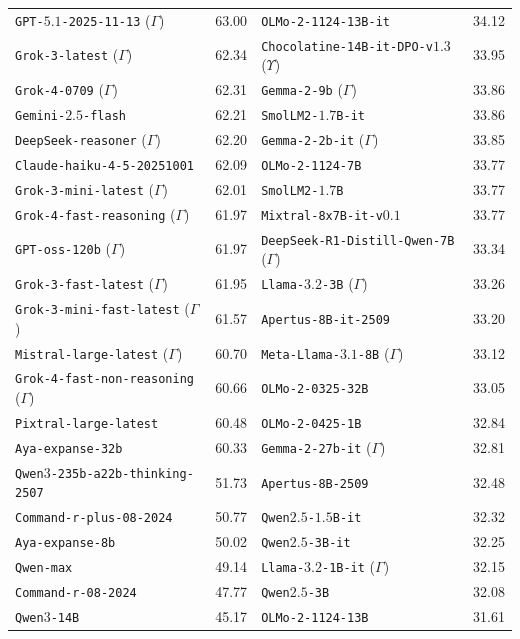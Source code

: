 \begin{tabular}{lrlr}
\texttt{GPT-$5.1$-2025-11-13} ($\Gamma$) & 63.00 & \texttt{OLMo-2-1124-13B-it} & 34.12 \\
\texttt{Grok-3-latest} ($\Gamma$) & 62.34 & \texttt{Chocolatine-14B-it-DPO-v$1.3$} ($\Upsilon$) & 33.95 \\
\texttt{Grok-4-0709} ($\Gamma$) & 62.31 & \texttt{Gemma-2-9b} ($\Gamma$) & 33.86 \\
\texttt{Gemini-$2.5$-flash} & 62.21 & \texttt{SmolLM2-$1.7$B-it} & 33.86 \\
\texttt{DeepSeek-reasoner} ($\Gamma$) & 62.20 & \texttt{Gemma-2-2b-it} ($\Gamma$) & 33.85 \\
\texttt{Claude-haiku-4-5-20251001} & 62.09 & \texttt{OLMo-2-1124-7B} & 33.77 \\
\texttt{Grok-3-mini-latest} ($\Gamma$) & 62.01 & \texttt{SmolLM2-$1.7$B} & 33.77 \\
\texttt{Grok-4-fast-reasoning} ($\Gamma$) & 61.97 & \texttt{Mixtral-8x7B-it-v$0.1$} & 33.77 \\
\texttt{GPT-oss-120b} ($\Gamma$) & 61.97 & \texttt{DeepSeek-R1-Distill-Qwen-7B} ($\Gamma$) & 33.34 \\
\texttt{Grok-3-fast-latest} ($\Gamma$) & 61.95 & \texttt{Llama-$3.2$-3B} ($\Gamma$) & 33.26 \\
\texttt{Grok-3-mini-fast-latest} ($\Gamma$) & 61.57 & \texttt{Apertus-8B-it-2509} & 33.20 \\
\texttt{Mistral-large-latest} ($\Gamma$) & 60.70 & \texttt{Meta-Llama-$3.1$-8B} ($\Gamma$) & 33.12 \\
\texttt{Grok-4-fast-non-reasoning} ($\Gamma$) & 60.66 & \texttt{OLMo-2-0325-32B} & 33.05 \\
\texttt{Pixtral-large-latest} & 60.48 & \texttt{OLMo-2-0425-1B} & 32.84 \\
\texttt{Aya-expanse-32b} & 60.33 & \texttt{Gemma-2-27b-it} ($\Gamma$) & 32.81 \\
\texttt{Qwen$3$-235b-a22b-thinking-2507} & 51.73 & \texttt{Apertus-8B-2509} & 32.48 \\
\texttt{Command-r-plus-08-2024} & 50.77 & \texttt{Qwen$2.5$-$1.5$B-it} & 32.32 \\
\texttt{Aya-expanse-8b} & 50.02 & \texttt{Qwen$2.5$-3B-it} & 32.25 \\
\texttt{Qwen-max} & 49.14 & \texttt{Llama-$3.2$-1B-it} ($\Gamma$) & 32.15 \\
\texttt{Command-r-08-2024} & 47.77 & \texttt{Qwen$2.5$-3B} & 32.08 \\
\texttt{Qwen$3$-14B} & 45.17 & \texttt{OLMo-2-1124-13B} & 31.61 \\

\end{tabular}

